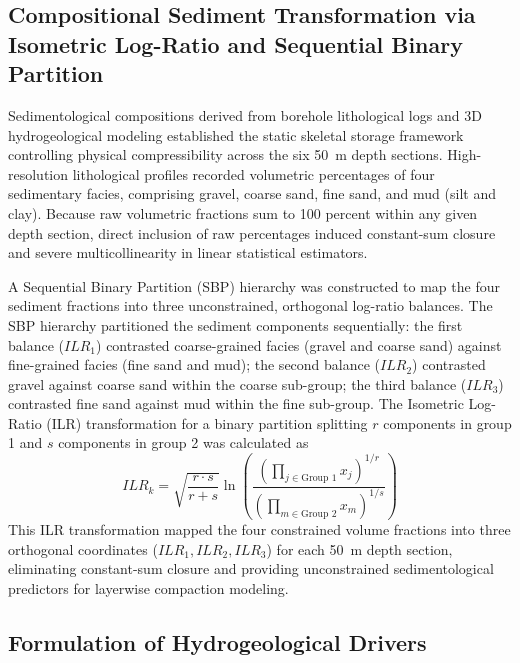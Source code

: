 \subsection{Compositional Sediment Transformation via Isometric Log-Ratio and Sequential Binary Partition}
\label{subsec:ilr_sbp_transformation}

Sedimentological compositions derived from borehole lithological logs and 3D hydrogeological modeling established the static skeletal storage framework controlling physical compressibility across the six 50~m depth sections. High-resolution lithological profiles recorded volumetric percentages of four sedimentary facies, comprising gravel, coarse sand, fine sand, and mud (silt and clay). Because raw volumetric fractions sum to 100 percent within any given depth section, direct inclusion of raw percentages induced constant-sum closure and severe multicollinearity in linear statistical estimators.

A Sequential Binary Partition (SBP) hierarchy was constructed to map the four sediment fractions into three unconstrained, orthogonal log-ratio balances. The SBP hierarchy partitioned the sediment components sequentially: the first balance ($ILR_1$) contrasted coarse-grained facies (gravel and coarse sand) against fine-grained facies (fine sand and mud); the second balance ($ILR_2$) contrasted gravel against coarse sand within the coarse sub-group; the third balance ($ILR_3$) contrasted fine sand against mud within the fine sub-group. The Isometric Log-Ratio (ILR) transformation for a binary partition splitting $r$ components in group 1 and $s$ components in group 2 was calculated as \citep{egozcue_isometric_2003, oh_using_2024}
\begin{equation}
ILR_k = \sqrt{\frac{r \cdot s}{r + s}} \ln \left( \frac{\left( \prod_{j \in \text{Group 1}} x_j \right)^{1/r}}{\left( \prod_{m \in \text{Group 2}} x_m \right)^{1/s}} \right)
\label{eq:ilr_transformation}
\end{equation}
This ILR transformation mapped the four constrained volume fractions into three orthogonal coordinates ($ILR_{1}, ILR_{2}, ILR_{3}$) for each 50~m depth section, eliminating constant-sum closure and providing unconstrained sedimentological predictors for layerwise compaction modeling.

\subsection{Formulation of Hydrogeological Drivers}
\label{subsec:hydrogeological_drivers}

